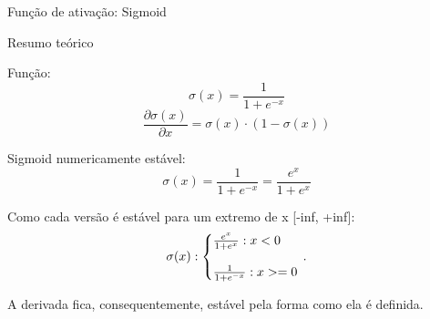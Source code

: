 \documentclass{article}
\begin{document}
\centerline{\sc \large Função de ativação: Sigmoid}
\vspace{.5pc}
\centerline{\sc Resumo teórico}
\vspace{4pc}

Função:
\[ \sigma(x) = \frac{1}{1 + e^{-x}}  \]
\[ \frac{\partial \sigma(x)}{\partial x} = \sigma(x) \cdot (1 - \sigma(x)) \]
\vspace{4pc}

Sigmoid numericamente estável:
\[ \sigma(x) = \frac{1}{1 + e^{-x}} = \frac{e^{x}}{1 + e^{x}} \]

Como cada versão é estável para um extremo de x [-inf, +inf]:
\[ \sigma(x): \left\{\begin{array}{@{}l@{}}
    \frac{e^{x}}{1 + e^{x}} : x < 0 \\
    \\
    \frac{1}{1 + e^{-x}} : x >= 0
  \end{array}\right.\,. \]
\vspace{4pc}

A derivada fica, consequentemente, estável pela forma como ela é definida.
\end{document}
